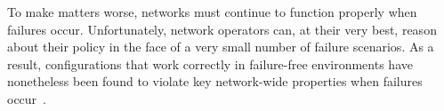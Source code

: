 




To make matters worse, networks must continue to function properly when failures occur.  
Unfortunately, network operators
can, at their very best, reason about their policy in the face of a very small number of failure 
scenarios.  As a result, configurations that work
correctly in failure-free environments have nonetheless been found to violate key
network-wide properties when failures occur~\cite{batfish}.

